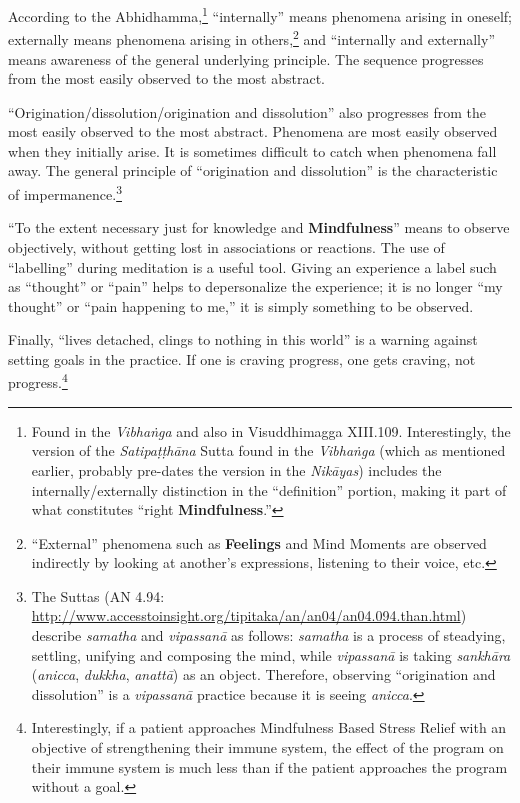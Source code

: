 According to the Abhidhamma,\footnote{Found in the \textit{Vibhaṅga} and also in Visuddhimagga XIII.109. Interestingly, the version of the \textit{Satipaṭṭhāna} Sutta found in the \textit{Vibhaṅga} (which as mentioned earlier, probably pre-dates the version in the \textit{Nikāyas}) includes the internally/externally distinction in the “definition” portion, making it part of what constitutes “right \textbf{Mindfulness}.”} “internally” means phenomena arising in oneself; externally means phenomena arising in others,\footnote{“External” phenomena such as \textbf{Feelings} and Mind Moments are observed indirectly by looking at another’s expressions, listening to their voice, etc.} and “internally and externally” means awareness of the general underlying principle. The sequence progresses from the most easily observed to the most abstract.

“Origination/dissolution/origination and dissolution” also progresses from the most easily observed to the most abstract. Phenomena are most easily observed when they initially arise. It is sometimes difficult to catch when phenomena fall away. The general principle of “origination and dissolution” is the characteristic of impermanence.\footnote{The Suttas (AN 4.94: \url{http://www.accesstoinsight.org/tipitaka/an/an04/an04.094.than.html}) describe \textit{samatha} and \textit{vipassanā} as follows: \textit{samatha} is a process of steadying, settling, unifying and composing the mind, while \textit{vipassanā} is taking \textit{sankhāra} (\textit{anicca}, \textit{dukkha}, \textit{anattā}) as an object. Therefore, observing “origination and dissolution” is a \textit{vipassanā} \color{blue} practice\color{black} because it is seeing \textit{anicca}.}

“To the extent necessary just for knowledge and \textbf{Mindfulness}” means to observe objectively, without getting lost in associations or reactions. The use of “labelling” during meditation is a useful tool. Giving an experience a label such as “thought” or “pain” helps to depersonalize the experience; it is no longer “my thought” or “pain happening to me,” it is simply something to be observed.

Finally, “lives detached, clings to nothing in this world” is a warning against setting goals in the \color{blue} practice\color{black}. If one is craving progress, one gets craving, not progress.\footnote{Interestingly, if a patient approaches Mindfulness Based Stress Relief with an objective of strengthening their immune system, the effect of the program on their immune system is much less than if the patient approaches the program without a goal.}

